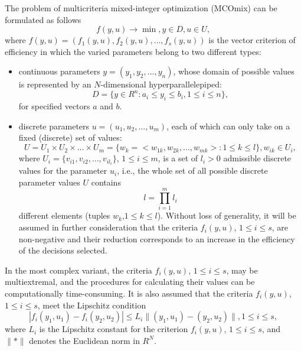\documentclass{svproc}
\begin{document}
The problem of multicriteria mixed-integer optimization (MCOmix) can be formulated as follows
\begin{equation}\label{eq:1}
f(y,u)\to \min, y\in D,u \in U,
\end{equation}
where $f(y,u)=(f_1 (y,u),f_2 (y,u), \dots,f_s (y,u))$ is the vector criterion of efficiency in which the varied parameters belong to two different types:
\begin{itemize}
	\item continuous parameters $y=(y_1,y_2,\dots,y_n)$, whose domain of possible values is represented by an $N$-dimensional hyperparallelepiped:
\begin{equation}\label{eq:2}
D=\{ y\in R^n: a_i \leq y_i \leq b_i, 1 \leq i \leq n \}, 
\end{equation}
for specified vectors $a$ and $b$.
	\item discrete parameters  $u=(u_1,u_2, \dots ,u_m)$, each of which can only take on a fixed (discrete) set of values:
\begin{equation}\label{eq:3}
U=U_1 \times U_2 \times \dots \times U_m=\{w_k=<w_{1k},w_{2k}, \dots, w_{mk}>: 1 \leq k \leq l\}, w_{ik} \in U_i, 
\end{equation}
where $U_i=\{v_{i1},v_{i2}, \dots ,v_{il_i} \}$, $1 \leq i \leq m$, is a set of $l_i>0$ admissible discrete values for the parameter $u_i$, i.e., the whole set of all possible discrete parameter values $U$ contains
\begin{equation}\label{eq:4}
  l=\prod\limits^m_{i = 1}{l_i}
\end{equation}
different elements (tuples $w_k$,$1 \leq k \leq l$). Without loss of generality, it will be assumed in further consideration that the criteria $f_i (y,u)$, $1 \leq i \leq s$, are non-negative and their reduction corresponds to an increase in the efficiency of the decisions selected.
\end{itemize}

In the most complex variant, the criteria $f_i(y,u)$, $1 \leq i \leq s$, may be multiextremal, and the procedures for calculating their values can be computationally time-consuming.  It is also assumed that the criteria $f_i (y,u)$, $1 \leq i \leq s$, meet the Lipschitz condition   
\begin{equation}\label{eq:5}
  |f_i (y_1,u_1 )-f_i (y_2, u_2 )| \leq L_i \|(y_1, u_1)-(y_2, u_2)\|, 1 \leq i \leq s,
\end{equation}
where $L_i$ is the Lipschitz constant for the criterion $f_i (y,u)$, $1 \leq i \leq s$,  and $\|*\|$ denotes the Euclidean norm in $R^N$. 
\end{document}
